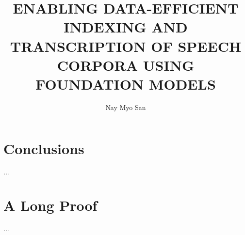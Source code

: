 \documentclass{report}
\begin{document}
\linenumbers

\title{ENABLING DATA-EFFICIENT INDEXING AND TRANSCRIPTION OF SPEECH CORPORA USING FOUNDATION MODELS}
\author{Nay Myo San}
 
\beforepreface
\afterpreface



\chapter{Conclusions}
...
\appendix
\chapter{A Long Proof}
...

\printbibliography
\end{document}
